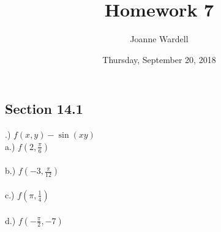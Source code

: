 \documentclass[12pt]{article}
\title{\vspace{-2.0cm}Homework 7}
\author{Joanne Wardell}
\date{Thursday, September 20, 2018}
\begin{document}
\maketitle


\subsection*{Section 14.1}


.) $f(x, y) - \sin(xy)$\\
\noindent a.) $f(2, \frac{\pi}{6})$\\\\
\noindent b.) $f(-3, \frac{\pi}{12})$\\\\
\noindent c.) $f(\pi, \frac{1}{4})$\\\\
\noindent d.) $f(-\frac{\pi}{2}, -7)$\\\\
\end{document}
